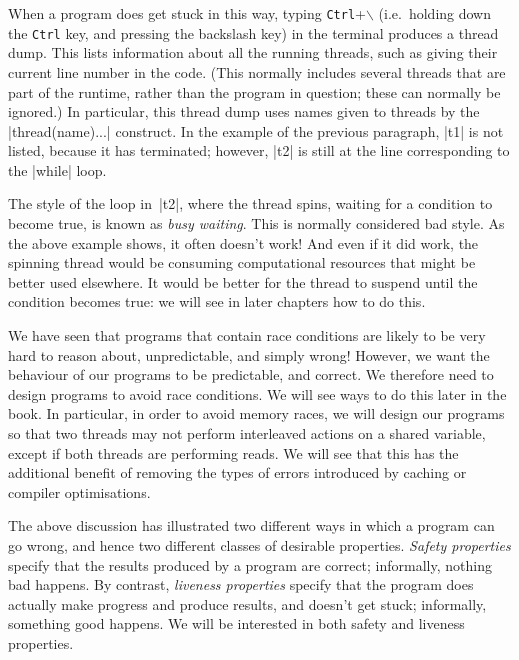 When a program does get stuck in this way, typing \texttt{Ctrl}+$\backslash$
(i.e.~holding down the \texttt{Ctrl} key, and pressing the backslash key) in
the terminal produces a thread dump.  This lists information about all the
running threads, such as giving their current line number in the code.  (This
normally includes several threads that are part of the runtime, rather than
the program in question; these can normally be ignored.)  In particular, this
thread dump uses names given to threads by the |thread(name){...}| construct.
In the example of the previous paragraph, |t1| is not listed, because it has
terminated; however, |t2| is still at the line corresponding to the |while|
loop.

The style of the loop in~|t2|, where the thread spins, waiting for a condition
to become true, is known as \emph{busy waiting}.  This is normally considered
bad style.  As the above example shows, it often doesn't work!  And even if it
did work, the spinning thread would be consuming computational resources that
might be better used elsewhere.  It would be better for the thread to suspend
until the condition becomes true: we will see in later chapters how to do
this.  

We have seen that programs that contain race conditions are likely to be very
hard to reason about, unpredictable, and simply wrong!  However, we want the
behaviour of our programs to be predictable, and correct.  We therefore need
to design programs to avoid race conditions.  We will see ways to do this
later in the book.  In particular, in order to avoid memory races, we will
design our programs so that two threads may not perform interleaved actions on
a shared variable, except if both threads are performing reads.  We will see
that this has the additional benefit of removing the types of errors
introduced by caching or compiler optimisations.

The above discussion has illustrated two different ways in which a program can
go wrong, and hence two different classes of desirable properties.
\emph{Safety properties} specify that the results produced by a program are
correct; informally, nothing bad happens.  By contrast, \emph{liveness
  properties} specify that the program does actually make progress and produce
results, and doesn't get stuck; informally, something good happens.  We will
be interested in both safety and liveness properties. 


